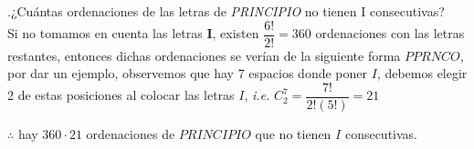 \documentclass[letterpaper]{article}
\renewcommand{\*}{\cdot}
\theoremstyle{definition}
\begin{document}
.¿Cuántas ordenaciones de las letras de \textit{PRINCIPIO} no tienen I consecutivas?\\
Si no tomamos en cuenta las letras \textbf{I}, existen $ \dfrac{6!}{2!} = 360 $ ordenaciones con las letras restantes, entonces dichas ordenaciones se verían de la siguiente forma $ PPRNCO $, por dar un ejemplo, observemos que hay 7 espacios donde poner $ I $, debemos elegir 2 de estas posiciones al colocar las letras $ I $, \textit{i.e.} $ C_2^7 = \dfrac{7!}{2!(5!)} = 21 $
\begin{center}
	$ \therefore  $ hay $ 360 \* 21 $ ordenaciones de $ PRINCIPIO $ que no tienen $ I$ consecutivas.
\end{center}
\end{document}

